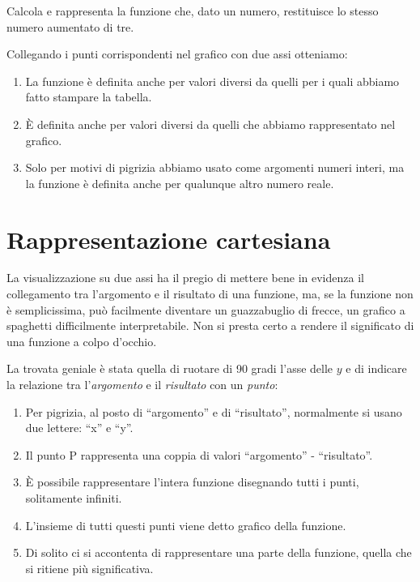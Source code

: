 \begin{esempio}
Calcola e rappresenta la funzione che, dato un numero, restituisce lo 
stesso numero aumentato di tre.


Collegando i punti corrispondenti nel grafico con due assi otteniamo:

\end{esempio}


\begin{osservazione}
\begin{enumerate}
\item La funzione è definita anche per valori diversi da quelli per i quali 
abbiamo fatto stampare la tabella.
\item È definita anche per valori diversi da quelli che abbiamo 
rappresentato nel grafico.
\item Solo per motivi di pigrizia abbiamo usato come argomenti numeri 
interi, ma la funzione è definita anche per qualunque altro numero reale.
\end{enumerate}
\end{osservazione}

\section{Rappresentazione cartesiana}
\label{sec:funzioni2_rcartesiana}

La visualizzazione su due assi ha il pregio di mettere bene in evidenza il 
collegamento tra l'argomento e il risultato di una funzione, ma, se la 
funzione non è semplicissima, può facilmente diventare un guazzabuglio di 
frecce, un grafico a spaghetti difficilmente interpretabile. Non si presta 
certo a rendere il significato di una funzione a colpo d'occhio.

La trovata geniale è stata quella di ruotare di 90 gradi l'asse delle \(y\) e 
di indicare la relazione tra l'\emph{argomento} e il \emph{risultato} con 
un \emph{punto}:


\begin{osservazione}
\begin{enumerate} [nosep]
\item Per pigrizia, al posto di  ``argomento'' e di  ``risultato'', 
normalmente si usano due lettere:  ``x'' e  ``y''.
\item Il punto P rappresenta una coppia di valori  ``argomento'' -  
``risultato''.
\item È possibile rappresentare l'intera funzione disegnando tutti i punti, 
solitamente infiniti.
\item L'insieme di tutti questi punti viene detto grafico della funzione.
\item Di solito ci si accontenta di rappresentare una parte della funzione, 
quella che si ritiene più significativa.
\end{enumerate}
\end{osservazione}


